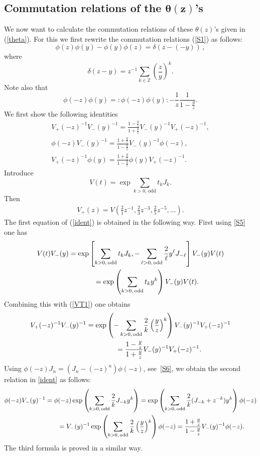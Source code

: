 \subsection[Commutation relations of the $\theta(z)$'s]{Commutation relations of the $\boldsymbol{\theta(z)}$'s}

We now want to calculate the commutation relations of these
$\theta(z)$'s given in (\ref{theta}).  For this we f\/irst rewrite the commutation relations
(\ref{S1}) as follows:
\[
\phi(z)\phi(y)-\phi(y)\phi(z)=\delta(z-(-y))\,,
\]
where
\[
\delta(z-y)=z^{-1}\sum_{k\in\mathbb{Z}}
\left(\frac{z}{y}\right)^k.
\]
Note also that
\[
\phi(-z)\phi(y)={:}\phi(-z)\phi(y){:}-\frac{1}{z}\frac{1}{1-\frac{y}{z}}  .
\]
We f\/irst show the following identities
\begin{gather}
V_+(-z)^{-1}V_-(y)^{-1} =
\frac{1-\frac{y}{z}}{1+\frac{y}{z}}V_-(y)^{-1}V_+(-z)^{-1},\nonumber\\
\phi(-z)V_-(y)^{-1} =
\frac{1+\frac{y}{z}}{1-\frac{y}{z}}V_-(y)^{-1}\phi(-z),\nonumber\\
V_+(-z)^{-1}\phi(y) =
\frac{1+\frac{y}{z}}{1-\frac{y}{z}}\phi(y)V_+(-z)^{-1}.\label{ident}
\end{gather}
Introduce
\[
V(t)=\exp\sum_{k>0,\,\mathrm{odd}}t_k J_k .
\]
Then
\begin{gather}
\label{VT1}
V_+(z)=V\left(\frac21 z^{-1},\frac23 z^{-3},\frac25 z^{-5},\ldots\right) .
\end{gather}
The f\/irst equation of (\ref{ident}) is obtained in the following
way. First using \eqref{S5} one has
\begin{gather*}
V(t)V_-(y) =\exp \left[  \sum_{k>0,\,\mathrm{odd}} t_kJ_k,
- \sum_{\ell>0,\,\mathrm{odd}} \frac{2}{\ell}y^{\ell}J_{-\ell}\right]V_-(y)V(t)\\
\hphantom{V(t)V_-(y)}{}  =\exp \left(\sum_{k>0,\,\mathrm{odd}}t_{k}y^k
\right)
V_-(y)V(t)  .
\end{gather*}
Combining this with (\ref{VT1}) one obtains
\begin{gather*}
V_+(-z)^{-1}V_-(y)^{-1} =\exp \left(-\sum_{k>0,\,\mathrm{odd}} \frac{2}{k}\left(
\frac{y}{z}\right)^k\right)
V_-(y)^{-1}V_+(-z)^{-1}\\
\hphantom{V_+(-z)^{-1}V_-(y)^{-1}}{}
 =\frac{1-\frac{y}{z}}{1+\frac{y}{z}}V_-(y)^{-1}V_+(-z)^{-1}.
\end{gather*}
Using $\phi(-z)J_n=(J_n-(-z)^n)\phi(-z)$, see~\eqref{S6},
we obtain the second relation in \eqref{ident} as follows:
\begin{gather*}
\phi(-z)V_-(y)^{-1} =
\phi(-z)\exp\left(\sum_{k>0,\,\rm odd}\frac2kJ_{-k}y^k\right)
 =
\exp\left(\sum_{k>0,\,\rm odd}\frac2k(J_{-k}+z^{-k})y^k\right)\phi(-z)
\\
 \phantom{\phi(-z)V_-(y)^{-1}}{}
 =V_-(y)^{-1}\exp \left( \sum_{k>0,\,\mathrm{odd}}
\frac{2}{k}\left( \frac{y}{z}\right)^{k}\right)\phi(-z)
 =\frac{1+\frac{y}{z}}{1-\frac{y}{z}}V_-(y)^{-1}\phi(-z).
\end{gather*}
The third formula is proved in a similar way.

